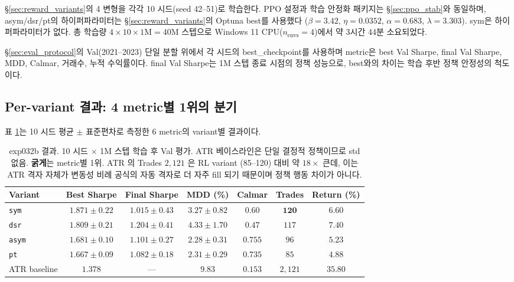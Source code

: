 \documentclass[11pt, a4paper]{article}
\begin{document}
\S\ref{sec:reward_variants}의 4 변형을 각각 10 시드(seed 42--51)로 학습한다.
PPO 설정과 학습 안정화 패키지는 \S\ref{sec:ppo_stab}와 동일하며, asym/dsr/pt의
하이퍼파라미터는 \S\ref{sec:reward_variants}의 Optuna best를 사용했다
($\beta=3.42$, $\eta=0.0352$, $\alpha=0.683$, $\lambda=3.303$).
sym은 하이퍼파라미터가 없다. 총 학습량 $4 \times 10 \times 1\mathrm{M} = 40$M
스텝으로 Windows 11 CPU($n_{\text{envs}}=4$)에서 약 3시간 44분 소요되었다.

 \S\ref{sec:eval_protocol}의 Val(2021--2023) 단일 분할 위에서
각 시드의 best\_checkpoint를 사용하며 metric은 best Val Sharpe, final Val Sharpe,
MDD, Calmar, 거래수, 누적 수익률이다. final Val Sharpe는 1M 스텝 종료 시점의
정책 성능으로, best와의 차이는 학습 후반 정책 안정성의 척도이다.

\subsection{Per-variant 결과: 4 metric별 1위의 분기}
\label{sec:pareto_per_variant}

표 \ref{tab:pareto_metrics}는 10 시드 평균 $\pm$ 표준편차로 측정한 6 metric의
variant별 결과이다.

\begin{table}[!htbp]
\centering
\small
\caption{exp032b 결과. 10 시드 $\times$ 1M 스텝 학습 후 Val 평가. ATR
베이스라인은 단일 결정적 정책이므로 std 없음. \textbf{굵게}는 metric별 1위.
ATR 의 Trades $2{,}121$ 은 RL variant (85--120) 대비 약 $18\times$ 큰데, 이는
ATR 격자 자체가 변동성 비례 공식의 자동 격자로 더 자주 fill 되기 때문이며
정책 행동 차이가 아니다.}
\begin{tabular}{lcccccc}
\toprule
Variant & Best Sharpe & Final Sharpe & MDD (\%) & Calmar & Trades & Return (\%) \\
\midrule
\texttt{sym}  & $\mathbf{1.871 \pm 0.22}$ & $1.015 \pm 0.43$ & $3.27 \pm 0.82$ &
$0.60$ & $\mathbf{120}$ & $6.60$ \\
\texttt{dsr}  & $1.809 \pm 0.21$ & $\mathbf{1.204 \pm 0.41}$ & $4.33 \pm 1.70$ &
$0.47$ & $117$ & $\mathbf{7.40}$ \\
\texttt{asym} & $1.681 \pm 0.10$ & $1.101 \pm 0.27$ & $\mathbf{2.28 \pm 0.31}$ &
$\mathbf{0.755}$ & $96$ & $5.23$ \\
\texttt{pt}   & $1.667 \pm 0.09$ & $1.082 \pm 0.18$ & $2.31 \pm 0.29$ &
$0.735$ & $85$ & $4.88$ \\
\midrule
ATR baseline & $1.378$ & --- & $9.83$ & $0.153$ & $2{,}121$ & $35.80$ \\
\bottomrule
\end{tabular}
\label{tab:pareto_metrics}
\end{table}
\end{document}
